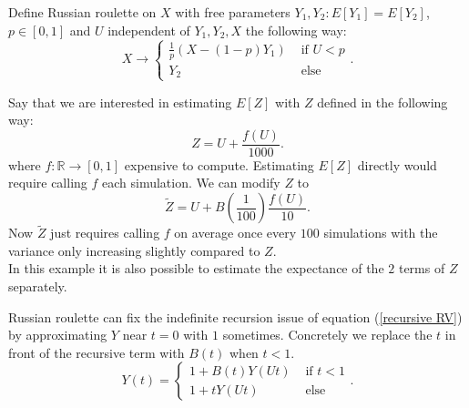 \documentclass[a4paper,12pt]{article}
\begin{document}
\begin{definition} \label{Russian roulette}
    Define Russian roulette on $X$ with free parameters
    $Y_{1},Y_{2}: E[Y_{1}] = E[Y_{2}]$, $p \in [0,1]$ and $U$
    independent of $Y_{1},Y_{2},X$ the following way:
    \[
        X \rightarrow \begin{cases}
            \frac{1}{p}(X- (1-p)Y_{1}) & \text{ if } U<p \\
            Y_{2}                      & \text{ else }
        \end{cases}
        .\]
\end{definition}

\begin{example}
    Say that we are interested in estimating $E[Z]$ with $Z$
    defined in the following way:
    \[
        Z = U + \frac{f(U)}{1000}
        .\]
    where $f:\mathbb{R} \rightarrow [0,1]$ expensive to compute.
    Estimating $E[Z]$ directly would require calling $f$ each
    simulation. We can modify $Z$ to
    \[
        \tilde{Z} = U + B\left(\frac{1}{100}\right)\frac{f(U)}{10}
        .\]
    Now $\tilde{Z}$
    just requires calling $f$ on average once every $100$ simulations with the variance
    only increasing slightly compared to $Z$. \\

    In this example it is also possible to estimate the expectance of the $2$
    terms of $Z$ separately.
\end{example}

\begin{example}
    Russian roulette can fix the indefinite recursion issue of
    equation (\ref{recursive RV}) by approximating $Y$ near $t = 0$ with $1$
    sometimes. Concretely
    we replace the $t$ in front of the recursive term with $B(t)$
    when $t<1$.
    \[
        Y(t) =
        \begin{cases}
            1 + B(t)Y(Ut) & \text{ if } t<1 \\
            1 + tY(Ut)    & \text{ else}
        \end{cases}
        .\]
\end{example}

\vspace{0.2cm}
\end{document}
